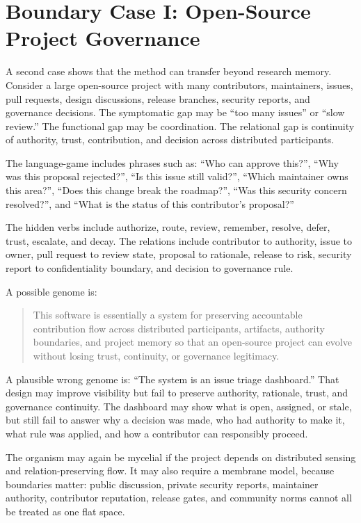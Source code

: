 \documentclass[11pt]{article}
\begin{document}
\section{Boundary Case I: Open-Source Project Governance}

A second case shows that the method can transfer beyond research memory. Consider a large open-source project with many contributors, maintainers, issues, pull requests, design discussions, release branches, security reports, and governance decisions. The symptomatic gap may be ``too many issues'' or ``slow review.'' The functional gap may be coordination. The relational gap is continuity of authority, trust, contribution, and decision across distributed participants.

The language-game includes phrases such as: ``Who can approve this?'', ``Why was this proposal rejected?'', ``Is this issue still valid?'', ``Which maintainer owns this area?'', ``Does this change break the roadmap?'', ``Was this security concern resolved?'', and ``What is the status of this contributor's proposal?''

The hidden verbs include authorize, route, review, remember, resolve, defer, trust, escalate, and decay. The relations include contributor to authority, issue to owner, pull request to review state, proposal to rationale, release to risk, security report to confidentiality boundary, and decision to governance rule.

A possible genome is:

\begin{quote}
This software is essentially a system for preserving accountable contribution flow across distributed participants, artifacts, authority boundaries, and project memory so that an open-source project can evolve without losing trust, continuity, or governance legitimacy.
\end{quote}

A plausible wrong genome is: ``The system is an issue triage dashboard.'' That design may improve visibility but fail to preserve authority, rationale, trust, and governance continuity. The dashboard may show what is open, assigned, or stale, but still fail to answer why a decision was made, who had authority to make it, what rule was applied, and how a contributor can responsibly proceed.

The organism may again be mycelial if the project depends on distributed sensing and relation-preserving flow. It may also require a membrane model, because boundaries matter: public discussion, private security reports, maintainer authority, contributor reputation, release gates, and community norms cannot all be treated as one flat space.
\end{document}
